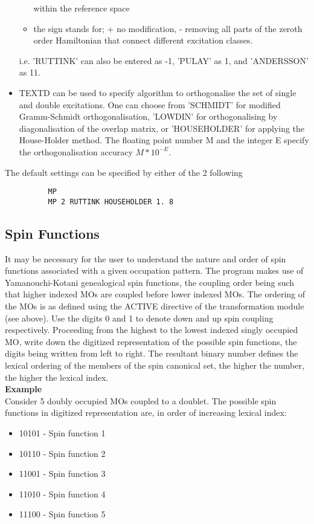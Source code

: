 \documentclass[11pt,fleqn]{article}
\begin{document}
\begin{itemize}
\begin{itemize}
            within the reference space
      \item the sign stands for; + no modification, - removing all parts of 
            the zeroth order Hamiltonian that connect different excitation
            classes.
      \end{itemize}
      i.e. 'RUTTINK' can also be entered as -1, 'PULAY' as 1, and 'ANDERSSON'
      as 11. 
\item TEXTD can be used to specify algorithm to orthogonalise the set of 
      single and double excitations. One can choose from 'SCHMIDT' for 
      modified Gramm-Schmidt orthogonalisation, 'LOWDIN' for orthogonalising
      by diagonalisation of the overlap matrix, or 'HOUSEHOLDER' for applying 
      the House-Holder method. The floating point number M and the integer E
      specify the orthogonalisation accuracy $M*10^{-E}$.
\end{itemize}
The default settings can be specified by either of the 2 following
{
\footnotesize
\begin{verbatim}
          MP
          MP 2 RUTTINK HOUSEHOLDER 1. 8
\end{verbatim}
}

\subsection[Spin Functions]{Spin Functions}

 It may be necessary for the user to understand the nature and order
of spin functions associated with a given occupation pattern.
The program makes use of Yamanouchi-Kotani genealogical spin functions,
the coupling order being such that higher indexed MOs are coupled before
lower indexed MOs. The ordering of the MOs is as defined using the ACTIVE
directive of the transformation module (see above).
 Use the digits 0 and 1 to denote down and up spin coupling respectively.
Proceeding from the highest to the lowest indexed singly occupied MO,
write down the digitized representation of the possible spin functions, the
digits being written from left to right. The resultant binary number defines
the lexical ordering of the members of the spin canonical set, the higher
the number, the higher the lexical index.\\

{\bf Example}\\

Consider 5 doubly occupied MOs coupled to a doublet.
The possible spin functions in digitized representation are, in order of
increasing lexical index:
\begin{itemize}
\item    10101   -   Spin function 1
\item    10110   -   Spin function 2
\item    11001   -   Spin function 3
\item    11010   -   Spin function 4
\item    11100   -   Spin function 5

\end{itemize}
\end{document}
